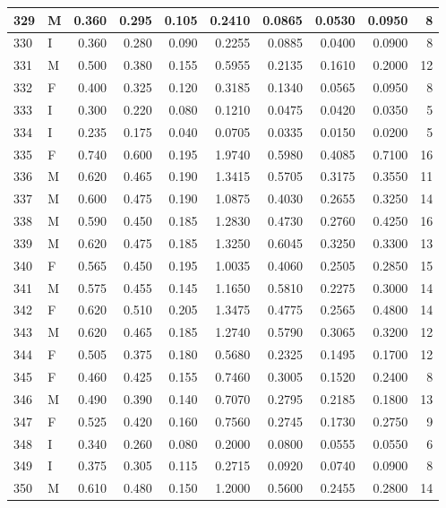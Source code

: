 \documentclass[9pt,twocolumn,twoside,]{pnas-new}
\begin{document}
\begin{tabular}{l|l|r|r|r|r|r|r|r|r}
\hline
329 & M & 0.360 & 0.295 & 0.105 & 0.2410 & 0.0865 & 0.0530 & 0.0950 & 8\\
\hline
330 & I & 0.360 & 0.280 & 0.090 & 0.2255 & 0.0885 & 0.0400 & 0.0900 & 8\\
\hline
331 & M & 0.500 & 0.380 & 0.155 & 0.5955 & 0.2135 & 0.1610 & 0.2000 & 12\\
\hline
332 & F & 0.400 & 0.325 & 0.120 & 0.3185 & 0.1340 & 0.0565 & 0.0950 & 8\\
\hline
333 & I & 0.300 & 0.220 & 0.080 & 0.1210 & 0.0475 & 0.0420 & 0.0350 & 5\\
\hline
334 & I & 0.235 & 0.175 & 0.040 & 0.0705 & 0.0335 & 0.0150 & 0.0200 & 5\\
\hline
335 & F & 0.740 & 0.600 & 0.195 & 1.9740 & 0.5980 & 0.4085 & 0.7100 & 16\\
\hline
336 & M & 0.620 & 0.465 & 0.190 & 1.3415 & 0.5705 & 0.3175 & 0.3550 & 11\\
\hline
337 & M & 0.600 & 0.475 & 0.190 & 1.0875 & 0.4030 & 0.2655 & 0.3250 & 14\\
\hline
338 & M & 0.590 & 0.450 & 0.185 & 1.2830 & 0.4730 & 0.2760 & 0.4250 & 16\\
\hline
339 & M & 0.620 & 0.475 & 0.185 & 1.3250 & 0.6045 & 0.3250 & 0.3300 & 13\\
\hline
340 & F & 0.565 & 0.450 & 0.195 & 1.0035 & 0.4060 & 0.2505 & 0.2850 & 15\\
\hline
341 & M & 0.575 & 0.455 & 0.145 & 1.1650 & 0.5810 & 0.2275 & 0.3000 & 14\\
\hline
342 & F & 0.620 & 0.510 & 0.205 & 1.3475 & 0.4775 & 0.2565 & 0.4800 & 14\\
\hline
343 & M & 0.620 & 0.465 & 0.185 & 1.2740 & 0.5790 & 0.3065 & 0.3200 & 12\\
\hline
344 & F & 0.505 & 0.375 & 0.180 & 0.5680 & 0.2325 & 0.1495 & 0.1700 & 12\\
\hline
345 & F & 0.460 & 0.425 & 0.155 & 0.7460 & 0.3005 & 0.1520 & 0.2400 & 8\\
\hline
346 & M & 0.490 & 0.390 & 0.140 & 0.7070 & 0.2795 & 0.2185 & 0.1800 & 13\\
\hline
347 & F & 0.525 & 0.420 & 0.160 & 0.7560 & 0.2745 & 0.1730 & 0.2750 & 9\\
\hline
348 & I & 0.340 & 0.260 & 0.080 & 0.2000 & 0.0800 & 0.0555 & 0.0550 & 6\\
\hline
349 & I & 0.375 & 0.305 & 0.115 & 0.2715 & 0.0920 & 0.0740 & 0.0900 & 8\\
\hline
350 & M & 0.610 & 0.480 & 0.150 & 1.2000 & 0.5600 & 0.2455 & 0.2800 & 14\\

\end{tabular}
\end{document}
